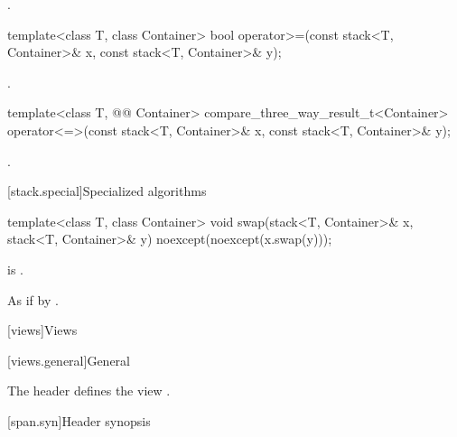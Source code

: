 \begin{itemdescr}
\pnum
\returns
{}.
\end{itemdescr}

%
\begin{itemdecl}
template<class T, class Container>
    bool operator>=(const stack<T, Container>& x, const stack<T, Container>& y);
\end{itemdecl}

\begin{itemdescr}
\pnum
\returns
{}.
\end{itemdescr}

%
\begin{itemdecl}
template<class T, @@ Container>
  compare_three_way_result_t<Container>
    operator<=>(const stack<T, Container>& x, const stack<T, Container>& y);
\end{itemdecl}

\begin{itemdescr}
\pnum
\returns
{}.
\end{itemdescr}

[stack.special]{Specialized algorithms}

%
\begin{itemdecl}
template<class T, class Container>
  void swap(stack<T, Container>& x, stack<T, Container>& y) noexcept(noexcept(x.swap(y)));
\end{itemdecl}

\begin{itemdescr}
\pnum
\constraints
{} is .

\pnum
\effects
As if by .
\end{itemdescr}

[views]{Views}

[views.general]{General}

\pnum
The header  defines the view .

[span.syn]{Header  synopsis}%

